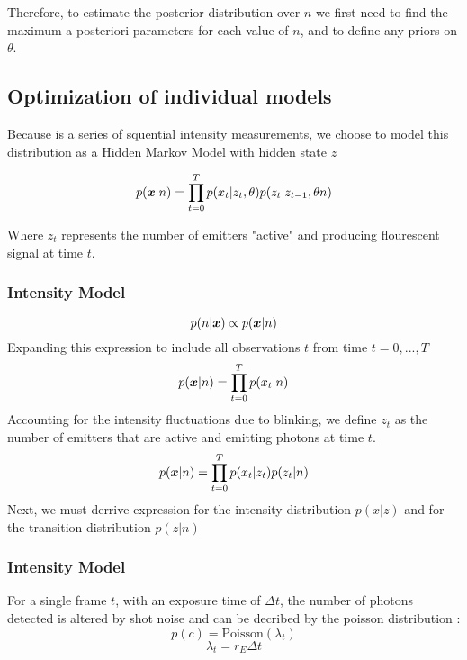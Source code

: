 Therefore, to estimate the posterior distribution over $n$ we first need to 
find the maximum a posteriori parameters for each value of $n$,
and to define any priors on $\theta$.

\subsection{Optimization of individual models}

Because \trace is a series of squential intensity measurements, 
we choose to model this distribution as a Hidden Markov Model with hidden state $z$

\begin{equation}
  p(\bm{x}| n) = \prod_{t=0}^{T} p(x_{t} | z_{t}, \theta) p(z_{t} | z_{t-1}, \theta n)
  \label{eq:method:base}
\end{equation}

Where $z_{t}$ represents the number of emitters "active" and producing 
flourescent signal at time $t$.

\subsubsection{Intensity Model}
%
\begin{equation*}
  p(n | \bm{x}) \propto p(\bm{x}| n)
\end{equation*}
%
Expanding this expression to include all observations $t$ from time $t=0,...,T$
%
\begin{equation*}
  p(\bm{x}| n) = \prod_{t=0}^{T} p(x_{t} | n)
\end{equation*}
%
Accounting for the intensity fluctuations due to blinking, 
we define $z_{t}$ as the number of emitters that are active 
and emitting photons at time $t$.
%
\begin{equation}
  p(\bm{x}| n) = \prod_{t=0}^{T} p(x_{t} | z_{t}) p(z_{t} | n)
  \label{eq:method:base}
\end{equation}
%
Next, we must derrive expression for the intensity distribution $p(x | z)$ 
and for the transition distribution $p(z | n)$

\subsubsection{Intensity Model}

For a single frame $t$, with an exposure time of $\Delta t$, 
the number of photons detected is altered by shot noise and can be decribed 
by the poisson distribution \cite{mehta_poisson_2016}:
%
\begin{equation*}
  p(c) = \text{Poisson}(\lambda_{t})
\end{equation*}
\begin{equation*}
  \lambda_{t} = r_{E} \Delta t
\end{equation*}


